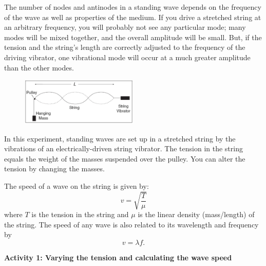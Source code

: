 The number of nodes and antinodes in a standing wave depends on the frequency of the wave as well as properties of the medium.  
If you drive a stretched string at an arbitrary frequency, you will probably not see any particular mode; many modes will be mixed together, and the overall amplitude will be small.
But, if the tension and the string's length are correctly adjusted to the frequency of the driving vibrator, one vibrational mode will occur at a much
greater amplitude than the other modes.

\begin{figure}
\vspace{-0.15in}
    \includegraphics[width=0.5\textwidth]{standing_waves_strings/standing_waves_strings_fig2_tb.pdf}
\end{figure}

\vspace{0.1in}
In this experiment, standing waves are set up in a stretched string by the vibrations of an electrically-driven string vibrator. The tension in the
string equals the weight of the masses suspended over the pulley. You can alter the tension by
changing the masses. 


The speed of a wave on the string is given by:
\begin{equation*}
v=\sqrt{\frac {T}{\mu }}
\end{equation*}
where $T$ is the tension in the string and $\mu $ is the linear density (mass/length) of the string.  The speed of any wave is also related to its wavelength and frequency by
\begin{equation*}
v=\lambda f.
\end{equation*}


\textbf{Activity 1: Varying the tension and calculating the wave speed}


